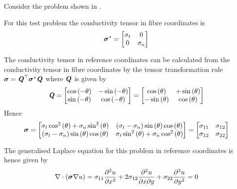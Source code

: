 Consider the problem shown in .


For this test problem the conductivity tensor in fibre coordinates is
\begin{equation}
  \boldsymbol{\mathit{\sigma}}^{*}=\begin{bmatrix}
    \sigma_{t} & 0 \\ 
    0 & \sigma_{n}
  \end{bmatrix}
\end{equation}

The conductivity tensor in  reference coordinates can be calculated from the
conductivity tensor in  fibre coordinates by the tensor transformation rule
$\boldsymbol{\mathit{\sigma}}= {\boldsymbol{\mathit{Q}}}^{ \top } \boldsymbol{\mathit{\sigma}}^{*}\boldsymbol{\mathit{Q}}$ where
$\boldsymbol{\mathit{Q}}$ is given by
\begin{equation}
  \boldsymbol{\mathit{Q}}=\begin{bmatrix}
      \cos\left( -\theta \right)   & -  \sin\left( -\theta \right)   \\
      \sin\left( -\theta \right)   &   \cos\left( -\theta \right)  
  \end{bmatrix} = \begin{bmatrix}
      \cos\left( \theta \right)   & +  \sin\left( \theta \right)   \\
    -  \sin\left( \theta \right)   &   \cos\left( \theta \right)  
  \end{bmatrix}
\end{equation}
Hence
\begin{equation}
  \tensor{\sigma}=\begin{bmatrix}
    \sigma_{t}\cosinesq{\theta}+\sigma_{n}\sinesq{\theta} & 
    \pbrac{\sigma_{t}-\sigma_{n}}\sine{\theta}\cosine{\theta} \\
    \pbrac{\sigma_{t}-\sigma_{n}}\sine{\theta}\cosine{\theta} &
    \sigma_{t}\sinesq{\theta}+\sigma_{n}\cosinesq{\theta}
  \end{bmatrix} = \begin{bmatrix}
    \sigma_{11} & \sigma_{12} \\
    \sigma_{12} & \sigma_{22} 
  \end{bmatrix}
  \label{eqn:conductivtytransformation}
\end{equation}

The generalised Laplace equation for this problem in reference coordinates is
hence given by
\begin{equation}
  \divergence{}{\pbrac{\tensor{\sigma}\gradient{}u}}=\sigma_{11}\deltwosqby{u}
  {x}+2\sigma_{12}\deltwoby{u}{x}{y}+\sigma_{22}\deltwosqby{u}{y}
  =0
  \label{eqn:2DrcgenLaplace}
\end{equation}

